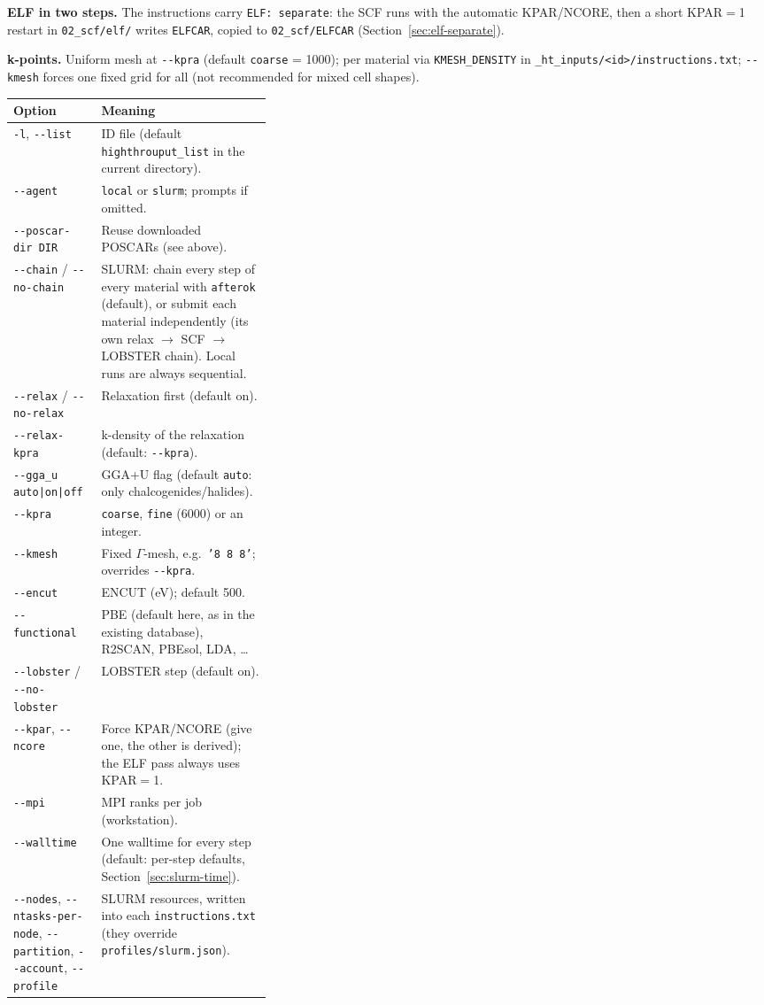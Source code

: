 \documentclass[11pt,a4paper]{scrartcl}
\newcommand{\thead}{\rowcolor{lightblue}}
\begin{document}
\textbf{ELF in two steps.}  The instructions carry \texttt{ELF: separate}: the
SCF runs with the automatic KPAR/NCORE, then a short KPAR${}={}$1 restart in
\texttt{02\_scf/elf/} writes \texttt{ELFCAR}, copied to
\texttt{02\_scf/ELFCAR} (Section~\ref{sec:elf-separate}).

\textbf{k-points.}  Uniform mesh at \texttt{-{}-kpra} (default
\texttt{coarse} = 1000); per material via \texttt{KMESH\_DENSITY} in
\texttt{\_ht\_inputs/<id>/instructions.txt}; \texttt{-{}-kmesh} forces one
fixed grid for all (not recommended for mixed cell shapes).

\begin{tabularx}{\linewidth}{@{}>{\raggedright\arraybackslash}p{0.34\linewidth}X@{}}
\thead
Option & Meaning \\ \midrule
\texttt{-l}, \texttt{-{}-list} & ID file (default \texttt{highthrouput\_list}
  in the current directory). \\
\texttt{-{}-agent} & \texttt{local} or \texttt{slurm}; prompts if omitted. \\
\texttt{-{}-poscar-dir DIR} & Reuse downloaded POSCARs (see above). \\
\texttt{-{}-chain} / \texttt{-{}-no-chain} & SLURM: chain every step of every
  material with \texttt{afterok} (default), or submit each material
  independently (its own relax $\to$ SCF $\to$ LOBSTER chain).  Local runs are
  always sequential. \\
\texttt{-{}-relax} / \texttt{-{}-no-relax} & Relaxation first (default on). \\
\texttt{-{}-relax-kpra} & k-density of the relaxation (default: \texttt{-{}-kpra}). \\
\texttt{-{}-gga\_u auto|on|off} & GGA+U flag (default \texttt{auto}: only
  chalcogenides/halides). \\
\texttt{-{}-kpra} & \texttt{coarse}, \texttt{fine} (6000) or an integer. \\
\texttt{-{}-kmesh} & Fixed $\Gamma$-mesh, e.g.\ \texttt{'8 8 8'}; overrides \texttt{-{}-kpra}. \\
\texttt{-{}-encut} & ENCUT (eV); default 500. \\
\texttt{-{}-functional} & PBE (default here, as in the existing database), R2SCAN,
  PBEsol, LDA, \ldots \\
\texttt{-{}-lobster} / \texttt{-{}-no-lobster} & LOBSTER step (default on). \\
\texttt{-{}-kpar}, \texttt{-{}-ncore} & Force KPAR/NCORE (give one, the other
  is derived); the ELF pass always uses KPAR${}={}$1. \\
\texttt{-{}-mpi} & MPI ranks per job (workstation). \\
\texttt{-{}-walltime} & One walltime for every step (default: per-step
  defaults, Section~\ref{sec:slurm-time}). \\
\texttt{-{}-nodes}, \texttt{-{}-ntasks-per-node},
  \texttt{-{}-partition}, \texttt{-{}-account}, \texttt{-{}-profile} & SLURM
  resources, written into each \texttt{instructions.txt} (they override
  \texttt{profiles/slurm.json}). \\
\bottomrule
\end{tabularx}
\end{document}
